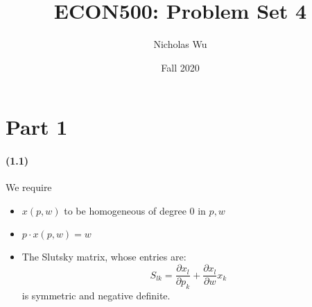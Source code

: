 \documentclass[10pt,letter]{article}
\begin{document}


\title{ECON500: Problem Set 4}

\author{Nicholas Wu}

\date{Fall 2020}

\maketitle


\section*{Part 1}
\paragraph{(1.1)}
We require
\begin{itemize}
\item $x(p,w)$ to be homogeneous of degree 0 in $p,w$
\item $p \cdot x(p,w) = w$
\item The Slutsky matrix, whose entries are: \[ S_{lk} = \frac{\partial x_l}{\partial p_k} + \frac{\partial x_l}{\partial w}x_k \]
is symmetric and negative definite.
\end{itemize}
\end{document}
